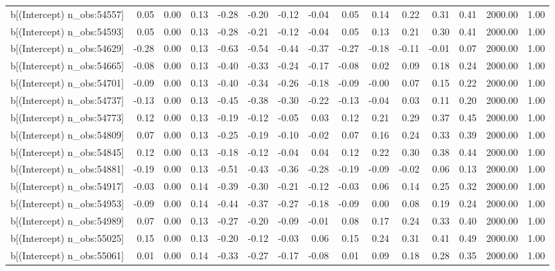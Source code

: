 \begin{table}[ht]
\begin{tabular}{rrrrrrrrrrrrrrr}
  b[(Intercept) n\_obs:54557] & 0.05 & 0.00 & 0.13 & -0.28 & -0.20 & -0.12 & -0.04 & 0.05 & 0.14 & 0.22 & 0.31 & 0.41 & 2000.00 & 1.00 \\ 
  b[(Intercept) n\_obs:54593] & 0.05 & 0.00 & 0.13 & -0.28 & -0.21 & -0.12 & -0.04 & 0.05 & 0.13 & 0.21 & 0.30 & 0.41 & 2000.00 & 1.00 \\ 
  b[(Intercept) n\_obs:54629] & -0.28 & 0.00 & 0.13 & -0.63 & -0.54 & -0.44 & -0.37 & -0.27 & -0.18 & -0.11 & -0.01 & 0.07 & 2000.00 & 1.00 \\ 
  b[(Intercept) n\_obs:54665] & -0.08 & 0.00 & 0.13 & -0.40 & -0.33 & -0.24 & -0.17 & -0.08 & 0.02 & 0.09 & 0.18 & 0.24 & 2000.00 & 1.00 \\ 
  b[(Intercept) n\_obs:54701] & -0.09 & 0.00 & 0.13 & -0.40 & -0.34 & -0.26 & -0.18 & -0.09 & -0.00 & 0.07 & 0.15 & 0.22 & 2000.00 & 1.00 \\ 
  b[(Intercept) n\_obs:54737] & -0.13 & 0.00 & 0.13 & -0.45 & -0.38 & -0.30 & -0.22 & -0.13 & -0.04 & 0.03 & 0.11 & 0.20 & 2000.00 & 1.00 \\ 
  b[(Intercept) n\_obs:54773] & 0.12 & 0.00 & 0.13 & -0.19 & -0.12 & -0.05 & 0.03 & 0.12 & 0.21 & 0.29 & 0.37 & 0.45 & 2000.00 & 1.00 \\ 
  b[(Intercept) n\_obs:54809] & 0.07 & 0.00 & 0.13 & -0.25 & -0.19 & -0.10 & -0.02 & 0.07 & 0.16 & 0.24 & 0.33 & 0.39 & 2000.00 & 1.00 \\ 
  b[(Intercept) n\_obs:54845] & 0.12 & 0.00 & 0.13 & -0.18 & -0.12 & -0.04 & 0.04 & 0.12 & 0.22 & 0.30 & 0.38 & 0.44 & 2000.00 & 1.00 \\ 
  b[(Intercept) n\_obs:54881] & -0.19 & 0.00 & 0.13 & -0.51 & -0.43 & -0.36 & -0.28 & -0.19 & -0.09 & -0.02 & 0.06 & 0.13 & 2000.00 & 1.00 \\ 
  b[(Intercept) n\_obs:54917] & -0.03 & 0.00 & 0.14 & -0.39 & -0.30 & -0.21 & -0.12 & -0.03 & 0.06 & 0.14 & 0.25 & 0.32 & 2000.00 & 1.00 \\ 
  b[(Intercept) n\_obs:54953] & -0.09 & 0.00 & 0.14 & -0.44 & -0.37 & -0.27 & -0.18 & -0.09 & 0.00 & 0.08 & 0.19 & 0.24 & 2000.00 & 1.00 \\ 
  b[(Intercept) n\_obs:54989] & 0.07 & 0.00 & 0.13 & -0.27 & -0.20 & -0.09 & -0.01 & 0.08 & 0.17 & 0.24 & 0.33 & 0.40 & 2000.00 & 1.00 \\ 
  b[(Intercept) n\_obs:55025] & 0.15 & 0.00 & 0.13 & -0.20 & -0.12 & -0.03 & 0.06 & 0.15 & 0.24 & 0.31 & 0.41 & 0.49 & 2000.00 & 1.00 \\ 
  b[(Intercept) n\_obs:55061] & 0.01 & 0.00 & 0.14 & -0.33 & -0.27 & -0.17 & -0.08 & 0.01 & 0.09 & 0.18 & 0.28 & 0.35 & 2000.00 & 1.00 \\ 

\end{tabular}
\end{table}
